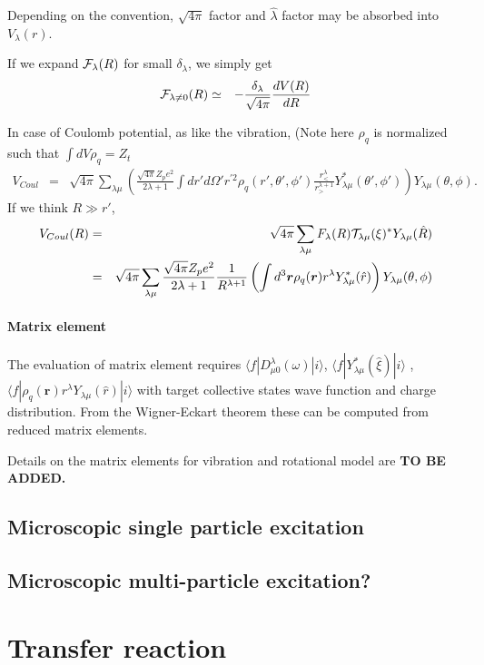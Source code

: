 \documentclass[11pt]{book}
\def\bm{\boldsymbol}
\def\vr{{\bm r}}
\def\la{\langle}
\def\ra{\rangle}
\newcommand{\bea}{\begin{eqnarray}}
\newcommand{\eea}{\end{eqnarray}}
\newcommand{\no}{\nonumber \\}
\begin{document}
Depending on the convention, $\sqrt{4\pi}$ factor and $\hat{\lambda}$ factor 
may be absorbed into $V_\lambda(r)$. 

If we expand ${\cal F}_\lambda(R)$ for small $\delta_\lambda$, we simply get
\bea 
{\cal F}_{\lambda\neq 0}(R)&\simeq &-\frac{\delta_\lambda}{\sqrt{4\pi}}\frac{d V(R)}{dR} 
\eea 

In case of Coulomb potential, as like the vibration, (Note here $\rho_q$ is normalized 
such that $\int dV \rho_q=Z_t $ 
\bea 
V_{Coul} &=& \sqrt{4\pi} \sum_{\lambda \mu}
          \left(   
          \frac{\sqrt{4\pi} Z_p e^2}{2\lambda+1} 
         \int dr' d\Omega' r^{'2} \rho_q(r',\theta',\phi')
          \frac{r^{\lambda}_{<}}{r^{\lambda+1}_{>}} Y^*_{\lambda\mu}(\theta',\phi') \right) 
          Y_{\lambda\mu}(\theta,\phi). 
\eea 
If we think $R\gg r'$,
\bea 
V_{Coul}(R)&=&\sqrt{4\pi} \sum_{\lambda \mu} F_\lambda(R){\cal T}_{\lambda\mu}(\xi)^*
               Y_{\lambda\mu}(\hat{R}) \no    
           &=&\sqrt{4\pi}\sum_{\lambda \mu}     
             \frac{\sqrt{4\pi} Z_p e^2}{2\lambda+1}\frac{1}{R^{\lambda+1}} 
             \left( \int d^3\vr \rho_q(\vr) r^\lambda Y^*_{\lambda\mu}(\hat{r})\right)
                   Y_{\lambda\mu}(\theta,\phi)
\eea 


\subsubsection{Matrix element} 
The evaluation of matrix element requires 
$\la f|D^\lambda_{\mu 0}(\omega)|i\ra $,  
$\la f|Y^*_{\lambda\mu}(\hat{\xi})|i\ra $ , 
$\la f|\rho_q(\vr) r^\lambda Y_{\lambda\mu}(\hat{r})|i\ra$
with target collective states wave function and charge distribution. 
From the Wigner-Eckart theorem these can be computed from reduced 
matrix elements. 

Details on the matrix elements for vibration and rotational model are 
{\bf TO BE ADDED.} 

\section{Microscopic single particle excitation}

\section{Microscopic multi-particle excitation?}  

\chapter{Transfer reaction} 
\end{document}
